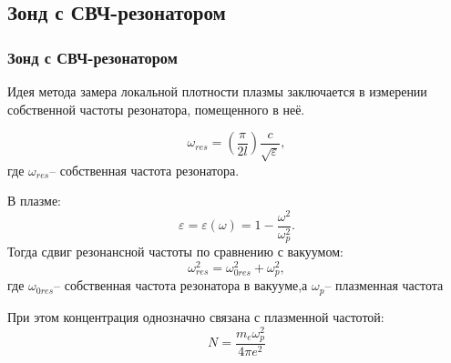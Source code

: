 \documentclass[10pt,pdf,hyperref={unicode}, dvipsnames]{beamer}
\begin{document}
\subsection{Зонд с СВЧ-резонатором} %

\begin{frame}
	\frametitle{Зонд с СВЧ-резонатором}
	Идея метода замера локальной  плотности плазмы заключается в измерении собственной частоты резонатора, помещенного в неё.

	\begin{equation}
		\omega_{res}=\left(\frac\pi{2l}\right)\frac c{\sqrt{\varepsilon}},
	\end{equation}
	где $\omega_{res}$-- собственная частота резонатора.

	В плазме: $$\varepsilon=\varepsilon(\omega)=1-\frac{\omega^2}{\omega_p^2}.$$ 
	Тогда сдвиг резонансной частоты по сравнению с вакуумом:
	$$\omega_{res}^2=\omega_{0res}^2+\omega_p^2,$$ 
	где $\omega_{0res}$-- собственная частота резонатора в вакууме,а $\omega_p$-- плазменная частота

	При этом концентрация однозначно связана с плазменной частотой:
	\begin{equation}
		N=\frac{m_e\omega^2_p}{4\pi e^2}
	\end{equation}
\end{frame}
\end{document}
